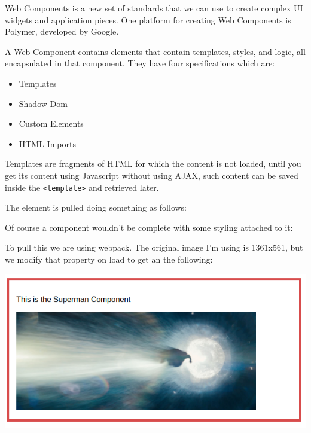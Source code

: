 
Web Components is a new set of standards that we can use to create complex UI
widgets and application pieces. One platform for creating Web Components is
Polymer, developed by Google.

A Web Component contains elements that contain templates, styles, and logic,
all encapsulated in that component. They have four specifications which are:

\begin{itemize}
    \item Templates
    \item Shadow Dom
    \item Custom Elements
    \item HTML Imports
\end{itemize}

\label{sec:01--templates}


Templates are fragments of HTML for which the content is not loaded, until you get its content using Javascript without
using AJAX, such content can be saved inside the \texttt{<template>} and retrieved later.



The element is pulled doing something as follows:



Of course a component wouldn't be complete with some styling attached to it:



To pull this we are using webpack. The original image I'm using is 1361x561, but we modify that
property on load to get an the following:

\includegraphics[width=0.5\linewidth]{./src/images/screenshot--superman.png}

\label{sec:01--adding-templates}

